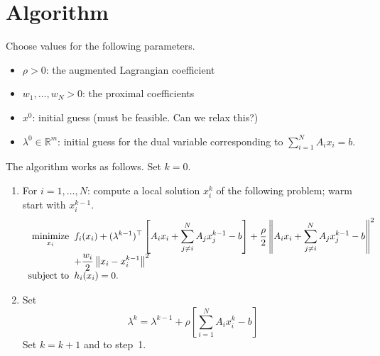 \documentclass[11pt]{article}
\newcommand{\comment}[1]{{\color{red}#1}}
\newcommand{\norm}[1]{\left\lVert #1 \right\rVert}
\begin{document}
\section{Algorithm}
Choose values for the following parameters.
\begin{itemize}
    \item $\rho > 0$: the augmented Lagrangian coefficient
    \item $w_1, \ldots, w_N > 0$: the proximal coefficients
    \item $x^0$: initial guess (must be feasible. \comment{Can we relax this?})
    \item $\lambda^0 \in \mathbb{R}^{m}$: initial guess for the dual variable corresponding to $\sum_{i = 1}^N A_i x_i = b$.
\end{itemize}

The algorithm works as follows. Set $k = 0$.
\begin{enumerate}
    \item For $i = 1, \ldots, N$: compute a local solution $x_i^k$ of the following problem; warm start with $x_i^{k-1}$.
    \begin{equation}\label{eq:primalstep}
    \begin{array}{r@{\;\;}l}
    \displaystyle\mathop{\text{minimize}}_{x_i} & \displaystyle f_i(x_i) + (\lambda^{k-1})^\top \left[ A_ix_i + \sum_{j \neq i}^N A_j x_j^{k-1} - b\right] + \frac{\rho}{2} \norm{A_ix_i + \sum_{j \neq i}^N A_j x_j^{k-1} - b}^2  \\
    &\displaystyle + \frac{w_i}{2} \norm{x_i - x_i^{k-1}}^2\\
    \text{subject to} & \displaystyle  h_i(x_i) = 0.
    \end{array}
    \end{equation}
    
    \item Set 
    \begin{equation}\label{eq:dualstep}
    \lambda^k = \lambda^{k - 1} + \rho \left[\sum_{i = 1}^N A_i x_i^k - b\right]
    \end{equation}
    Set $k = k + 1$ and to step~1.
\end{enumerate}
\end{document}
